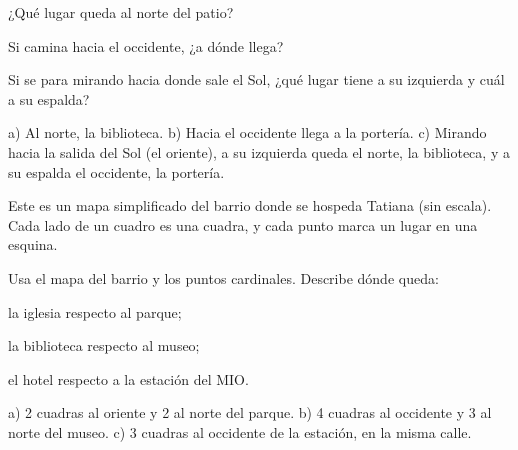 \documentclass[11pt]{article}
\newcommand{\rosa}[1]{%
  \begin{scope}[shift={(#1)}, font=\scriptsize]
    \draw[->] (0,0) -- (0,0.6) node[above] {N};
    \draw (0,0) -- (0,-0.6) node[below] {S};
    \draw (0,0) -- (0.6,0) node[right] {E};
    \draw (0,0) -- (-0.6,0) node[left] {O};
  \end{scope}}
\newcommand{\lineas}[1]{\ifdefined\clave\else\renglones{#1}\fi}
\begin{document}
\begin{preguntas}
\begin{opciones}
  \item ¿Qué lugar queda al norte del patio?
  \item Si camina hacia el occidente, ¿a dónde llega?
  \item Si se para mirando hacia donde sale el Sol, ¿qué lugar tiene a su izquierda y cuál a
        su espalda?
\end{opciones}
\begin{solucion}
a) Al norte, la biblioteca. b) Hacia el occidente llega a la portería. c) Mirando hacia la
salida del Sol (el oriente), a su izquierda queda el norte, la biblioteca, y a su espalda el
occidente, la portería.
\end{solucion}
\lineas{3}

\pregunta[2] Este es un mapa simplificado del barrio donde se hospeda Tatiana (sin escala).
Cada lado de un cuadro es una cuadra, y cada punto marca un lugar en una esquina.

\begin{center}
\end{center}

Usa el mapa del barrio y los puntos cardinales. Describe dónde queda:
\begin{opciones}
  \item la iglesia respecto al parque;
  \item la biblioteca respecto al museo;
  \item el hotel respecto a la estación del MIO.
\end{opciones}
\begin{solucion}
a) 2 cuadras al oriente y 2 al norte del parque. b) 4 cuadras al occidente y 3 al norte del
museo. c) 3 cuadras al occidente de la estación, en la misma calle.
\end{solucion}
\lineas{3}

\end{preguntas}
\end{document}
